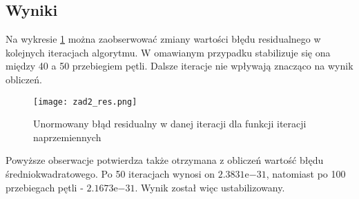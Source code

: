 \vspace{5mm}



\subsection{Wyniki}

Na wykresie \ref{rys:zad2_res} można zaobserwować zmiany wartości błędu residualnego w kolejnych iteracjach algorytmu. W omawianym przypadku stabilizuje się ona między 40 a 50 przebiegiem pętli. Dalsze iteracje nie wpływają znacząco na wynik obliczeń.

\begin{figure}[H]
	\centering
	\hspace*{-1.2in}
	\texttt{[image: zad2\_res.png]}
	\caption{Unormowany błąd residualny w danej iteracji dla funkcji iteracji naprzemiennych}  
	\label{rys:zad2_res} 
\end{figure}

Powyższe obserwacje potwierdza także otrzymana z obliczeń wartość błędu średniokwadratowego. Po 50 iteracjach wynosi on $2.3831\mathrm{e}{-31}$, natomiast po 100 przebiegach pętli - $2.1673\mathrm{e}{-31}$. Wynik został więc ustabilizowany.